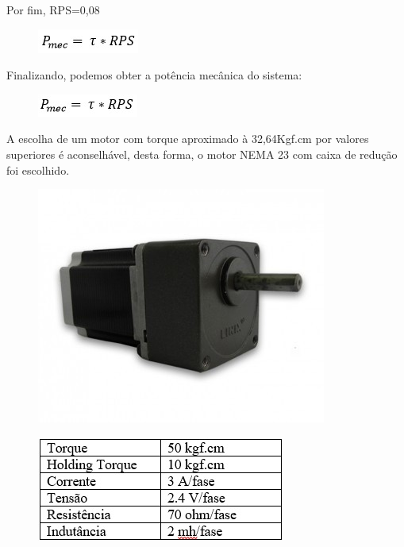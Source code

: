 Por fim, RPS=0,08


\begin{figure}[!h]
\centering
\includegraphics[scale=0.8, angle = 360]{figuras/formula7}
\caption[]{}
\end{figure}
\FloatBarrier

Finalizando, podemos obter a potência mecânica do sistema:
\begin{figure}[!h]
\centering
\includegraphics[scale=0.8, angle = 360]{figuras/formula8}
\caption[]{}
\end{figure}
\FloatBarrier


A escolha de um motor com torque aproximado à 
32,64Kgf.cm por valores superiores é aconselhável, desta forma, o motor NEMA 23 com caixa de redução foi escolhido.

\begin{figure}[!h]
\centering
\includegraphics[scale=0.8, angle = 360]{figuras/Motor}
\caption[]{}
\end{figure}
\FloatBarrier

\begin{figure}[!h]
\centering
\includegraphics[scale=0.8, angle = 360]{figuras/tabela_unipolar}
\caption[]{}
\end{figure}
\FloatBarrier

